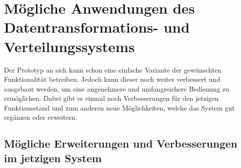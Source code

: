 \chapter{Mögliche Anwendungen des Datentransformations- und Verteilungssystems}

Der Prototyp an sich kann schon eine einfache Variante der gewünschten Funktionalität betreiben. Jedoch kann dieser noch weiter verbessert und ausgebaut werden, um eine angenehmere und umfangreichere Bedienung zu ermöglichen. Dabei gibt es einmal noch Verbesserungen für den jetzigen Funktionsstand und zum anderen neue Möglichkeiten, welche das System gut ergänzen oder erweitern. 

\section{Mögliche Erweiterungen und Verbesserungen im jetzigen System}


